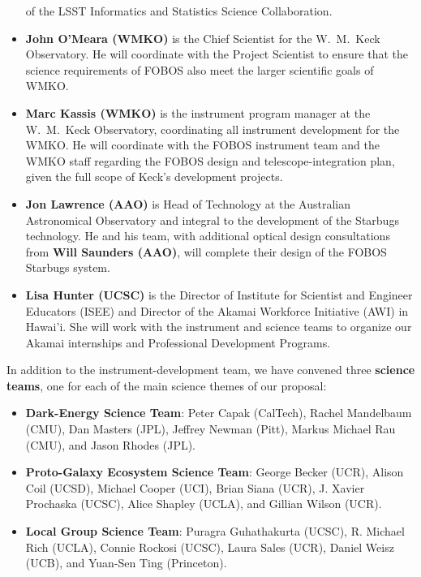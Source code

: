 \documentclass[oneside,11pt]{amsart}
\begin{document}
\begin{itemize}
of the LSST Informatics and Statistics Science Collaboration.\\[-5pt]
%
\item {\bf John O'Meara (WMKO)} is the Chief Scientist for the
W.~M.~Keck Observatory.  He will coordinate with the Project Scientist
to ensure that the science requirements of FOBOS also meet the larger
scientific goals of WMKO.\\[-5pt]
%
\item {\bf Marc Kassis (WMKO)} is the instrument program manager at the
W.~M.~Keck Observatory, coordinating all instrument development for the
WMKO.  He will coordinate with the FOBOS instrument team and the WMKO
staff regarding the FOBOS design and telescope-integration plan, given
the full scope of Keck's development projects.\\[-5pt]
%
\item {\bf Jon Lawrence (AAO)} is Head of Technology at the Australian
Astronomical Observatory and integral to the development of the Starbugs
technology.  He and his team, with additional optical design
consultations from {\bf Will Saunders (AAO)}, will complete their design
of the FOBOS Starbugs system.\\[-5pt]
%
\item {\bf Lisa Hunter (UCSC)} is the Director of Institute for
Scientist and Engineer Educators (ISEE) and Director of the Akamai
Workforce Initiative (AWI) in Hawai'i. She will work with the instrument
and science teams to organize our Akamai internships and Professional
Development Programs.
%
\end{itemize}

\newpage

\noindent In addition to the instrument-development team, we have
convened three {\bf science teams}, one for each of the main science
themes of our proposal:
%
\begin{itemize}
%
\item {\bf Dark-Energy Science Team}: Peter Capak (CalTech), Rachel
Mandelbaum (CMU), Dan Masters (JPL), Jeffrey Newman (Pitt), Markus
Michael Rau (CMU), and Jason Rhodes (JPL).\\[-5pt]
%
\item {\bf Proto-Galaxy Ecosystem Science Team}: George Becker (UCR),
Alison Coil (UCSD), Michael Cooper (UCI), Brian Siana (UCR), J. Xavier
Prochaska (UCSC), Alice Shapley (UCLA), and Gillian Wilson
(UCR).\\[-5pt]
%
\item {\bf Local Group Science Team}: Puragra Guhathakurta (UCSC), R.
Michael Rich (UCLA), Connie Rockosi (UCSC), Laura Sales (UCR), Daniel
Weisz (UCB), and Yuan-Sen Ting (Princeton).
%
\end{itemize}
\end{document}
